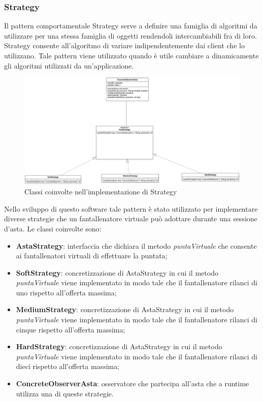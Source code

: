 \documentclass[12pt,a4paper]{article}
\begin{document}
\subsubsection{Strategy}
Il pattern comportamentale Strategy serve a definire una famiglia di algoritmi da utilizzare per una stessa famiglia di oggetti rendendoli intercambiabili fra di loro. Strategy consente all'algoritmo di variare indipendentemente dai client che lo utilizzano. Tale pattern viene utilizzato quando è utile cambiare a dinamicamente  gli algoritmi utilizzati da un'applicazione. 
\begin{figure}[h]
\centering
\includegraphics[width=18 cm ,keepaspectratio]{Strategy.png}
\caption{Classi coinvolte nell'implementazione di Strategy}
\end{figure}
\newline
Nello sviluppo di questo software tale pattern è stato utilizzato per implementare diverse strategie che un fantallenatore virtuale può adottare durante una sessione d'asta. Le classi coinvolte sono:
\begin{itemize}
\item \textbf{AstaStrategy}: interfaccia che dichiara il metodo \textit{puntaVirtuale} che consente ai fantallenatori virtuali di effettuare la puntata;
\item \textbf{SoftStrategy}: concretizzazione di AstaStrategy in cui il metodo \textit{puntaVirtuale} viene implementato in modo tale che il fantallenatore rilanci di uno rispetto all'offerta massima;
\item \textbf{MediumStrategy}: concretizzazione di AstaStrategy in cui il metodo \textit{puntaVirtuale} viene implementato in modo tale che il fantallenatore rilanci di cinque rispetto all'offerta massima;
\item \textbf{HardStrategy}: concretizzazione di AstaStrategy in cui il metodo \textit{puntaVirtuale} viene implementato in modo tale che il fantallenatore rilanci di dieci rispetto all'offerta massima;
\item \textbf{ConcreteObserverAsta}: osservatore che partecipa all'asta che a runtime utilizza una di queste strategie.

\end{itemize}
\end{document}
